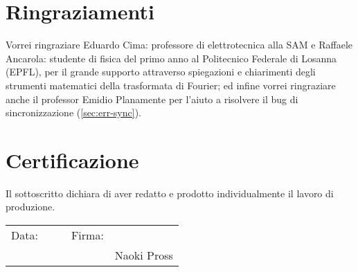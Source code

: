 \section{Ringraziamenti}
Vorrei ringraziare Eduardo Cima: professore di elettrotecnica alla SAM e
Raffaele Ancarola: studente di fisica del primo anno al Politecnico Federale
di Losanna (EPFL), per il grande supporto attraverso spiegazioni e chiarimenti
degli strumenti matematici della trasformata di Fourier; ed infine vorrei
ringraziare anche il professor Emidio Planamente per l'aiuto a risolvere il
bug di sincronizzazione (\ref{sec:err-sync}).


\section{Certificazione}
Il sottoscritto dichiara di aver redatto e prodotto individualmente il lavoro
di produzione.
\begin{flushright}
\begin{tabular}{ r p{5cm} p{1cm} r p{5cm}}
    Data: & \hrulefill && Firma: & \hrulefill \\
    &&&& Naoki Pross \\
\end{tabular}
\end{flushright}
